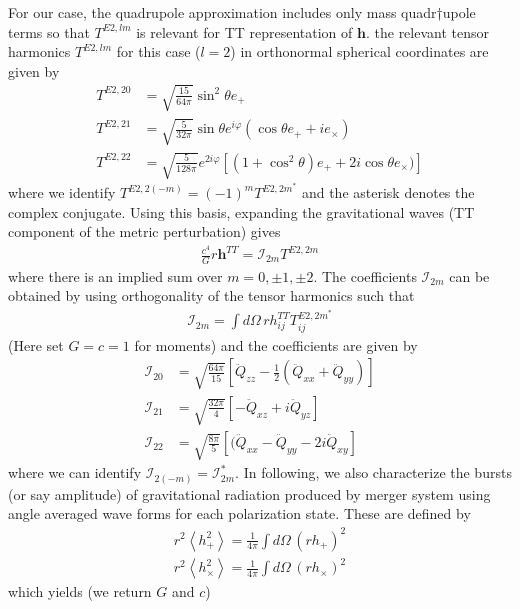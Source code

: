 \documentclass{article}
\begin{document}
For our case, the quadrupole approximation includes only mass quadr†upole terms
so that $T^{E2,lm}$ is relevant for TT representation of $\boldsymbol{h}$. 
the relevant tensor harmonics $T^{E2,lm}$ for this case ($l=2$) in orthonormal spherical
coordinates are given by
\begin{align}
T^{E2,20} &= \sqrt{\frac{15}{64\pi}} \sin^2 \theta e_+ \\
T^{E2,21} &= \sqrt{\frac{5}{32\pi}} \sin \theta e^{i\varphi} ( \cos \theta e_+ + i e_\times) \\
T^{E2,22} & = \sqrt{\frac{5}{128 \pi}} e^{2i\varphi}[(1+\cos^2 \theta) e_+ + 2i \cos \theta e_\times)]
\end{align}
where we identify $T^{E2, 2(-m)} = (-1)^m T^{E2, 2m^*}$ and the asterisk denotes
the complex conjugate. Using this basis, expanding the gravitational waves (TT component of
the metric perturbation) gives
\begin{align}
\frac{c^4}{G} r \boldsymbol{h}^{TT} = \mathscr{I}_{2m} T^{E2,2m}
\end{align}
where there is an implied sum over $m = 0, \pm 1, \pm 2$. The coefficients $\mathscr{I}_{2m}$
can be obtained by using orthogonality of the tensor harmonics such that
\begin{align}
\mathscr{I}_{2m} = \int d \Omega \, r h^{TT}_{ij} T^{E2, 2m^\ast}_{ij}
\end{align}
(Here set $G=c=1$ for moments) and the coefficients are given by
\begin{align}
\mathscr{I}_{20} &= \sqrt{\frac{64 \pi}{15}} \left[ \ddot{Q}_{zz} - \frac{1}{2} (\ddot{Q}_{xx} + \ddot{Q}_{yy}) \right] \\
\mathscr{I}_{21} &= \sqrt{\frac{32 \pi}{4}} [ - \ddot{Q}_{xz} +i \ddot{Q}_{yz}] \\
\mathscr{I}_{22} &= \sqrt{\frac{8\pi}{5}} [ (\ddot{Q}_{xx} - \ddot{Q}_{yy} - 2i \ddot{Q}_{xy}]
\end{align}
where we can identify $\mathscr{I}_{2(-m)} = \mathscr{I}^\ast_{2m}$.
In following, we also characterize the bursts (or say amplitude) of gravitational radiation produced
by merger system using angle averaged wave forms for each polarization state. These are
defined by
\begin{align}
r^2 \left\langle h_+^2 \right\rangle = \frac{1}{4 \pi} \int d\Omega \, (r h_+)^2 \\
r^2 \left\langle h_\times^2 \right\rangle = \frac{1}{4 \pi} \int d\Omega \, (r h_\times)^2 
\end{align}
which yields (we return $G$ and $c$)
\end{document}
